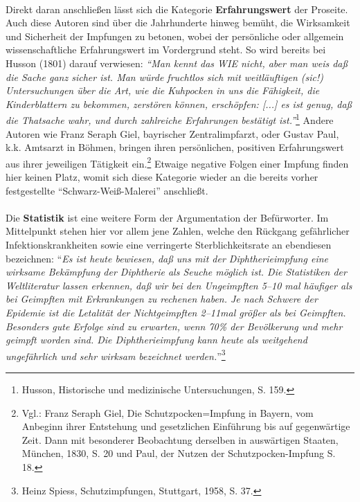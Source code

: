 \documentclass[
    a4paper,
    12pt,
    hyphens,
    chapterprefix=true,
    headheight=33pt,
    footheight=29pt,
    headings=optiontohead, %
]{scrartcl}
\begin{document}
{\\
Direkt daran anschließen lässt sich die Kategorie \textbf{Erfahrungswert} der Proseite. Auch diese Autoren sind über die Jahrhunderte hinweg bemüht, die Wirksamkeit und Sicherheit der Impfungen zu betonen, wobei der persönliche oder allgemein wissenschaftliche Erfahrungswert im Vordergrund steht. 
So wird bereits bei Husson (1801) darauf verwiesen: \textit{"`Man kennt das WIE nicht, aber man weis daß die Sache ganz sicher ist. Man würde fruchtlos sich mit weitläuftigen (sic!) Untersuchungen über die Art, wie die Kuhpocken in uns die Fähigkeit, die Kinderblattern zu bekommen, zerstören können, erschöpfen: [...] es ist genug, daß die Thatsache wahr, und durch zahlreiche Erfahrungen bestätigt ist."'}\footnote{Husson, Historische und medizinische Untersuchungen,  S. 159.} Andere Autoren wie Franz Seraph Giel, bayrischer Zentralimpfarzt, oder Gustav Paul, k.k. Amtsarzt in Böhmen, bringen ihren persönlichen, positiven Erfahrungswert aus ihrer jeweiligen Tätigkeit ein.\footnote{Vgl.: Franz Seraph Giel, Die Schutzpocken=Impfung in Bayern, vom Anbeginn ihrer Entstehung und gesetzlichen Einführung  bis auf gegenwärtige Zeit. Dann mit besonderer Beobachtung derselben in auswärtigen Staaten, München, 1830, S. 20 und Paul, der Nutzen der Schutzpocken-Impfung S. 18.} Etwaige negative Folgen einer Impfung finden hier keinen Platz, womit sich diese Kategorie wieder an die bereits vorher festgestellte "`Schwarz-Weiß-Malerei"' anschließt.\\ 
\\
Die \textbf{Statistik} ist eine weitere Form der Argumentation der Befürworter. Im Mittelpunkt stehen hier vor allem jene Zahlen, welche den Rückgang gefährlicher Infektionskrankheiten sowie eine verringerte Sterblichkeitsrate an ebendiesen bezeichnen: "`\textit{Es ist heute bewiesen, daß uns mit der Diphtherieimpfung eine wirksame Bekämpfung der Diphtherie als Seuche möglich ist. Die Statistiken der Weltliteratur lassen erkennen, daß wir bei den Ungeimpften 5--10 mal häufiger als bei Geimpften mit Erkrankungen zu rechenen haben. Je nach Schwere der Epidemie ist die Letalität der Nichtgeimpften 2--11mal größer als bei Geimpften. Besonders gute Erfolge sind zu erwarten, wenn 70\% der Bevölkerung und mehr geimpft worden sind. Die Diphtherieimpfung kann heute als weitgehend ungefährlich und sehr wirksam bezeichnet werden.}"'\footnote{Heinz Spiess, Schutzimpfungen, Stuttgart, 1958, S. 37.}\\
}
\end{document}
